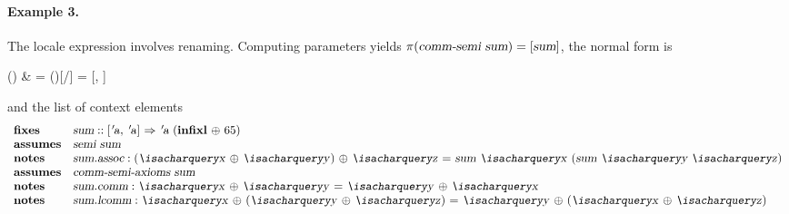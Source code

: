 \begin{isabellebody}
\begin{isamarkuptext}
\paragraph{Example 3.}
  The locale expression  involves
  renaming.  Computing parameters yields $\pi(\emph{\sl comm{\mbox{-}}semi\ sum})
  = [\emph{\sl sum}]$, the normal form is
\begin{align*%
}
  \N() & =
  \N()[/] =
  [, ]
\end{align*%
}
  and the list of context elements
\[
\begin{array}{ll}
  \textbf{fixes} & \isa{sum} :: \isa{{\isachardoublequote}{\isacharbrackleft}{\isacharprime}a{\isacharcomma}\ {\isacharprime}a{\isacharbrackright}\ {\isasymRightarrow}\ {\isacharprime}a{\isachardoublequote}}
    ~(\textbf{infixl}~\isa{{\isachardoublequote}{\isasymoplus}{\isachardoublequote}}~65) \\
  \textbf{assumes} & \isa{{\isachardoublequote}semi\ sum{\isachardoublequote}} \\
  \textbf{notes} & \isa{sum{\isachardot}assoc}: \isa{{\isachardoublequote}{\isacharparenleft}{\isacharquery}x\ {\isasymoplus}\ {\isacharquery}y{\isacharparenright}\ {\isasymoplus}\ {\isacharquery}z\ {\isacharequal}\ sum\ {\isacharquery}x\ {\isacharparenleft}sum\ {\isacharquery}y\ {\isacharquery}z{\isacharparenright}{\isachardoublequote}} \\
  \textbf{assumes} & \isa{{\isachardoublequote}comm{\isacharunderscore}semi{\isacharunderscore}axioms\ sum{\isachardoublequote}} \\
  \textbf{notes} & \isa{sum{\isachardot}comm}: \isa{{\isachardoublequote}{\isacharquery}x\ {\isasymoplus}\ {\isacharquery}y\ {\isacharequal}\ {\isacharquery}y\ {\isasymoplus}\ {\isacharquery}x{\isachardoublequote}} \\
  \textbf{notes} & \isa{sum{\isachardot}lcomm}: \isa{{\isachardoublequote}{\isacharquery}x\ {\isasymoplus}\ {\isacharparenleft}{\isacharquery}y\ {\isasymoplus}\ {\isacharquery}z{\isacharparenright}\ {\isacharequal}\ {\isacharquery}y\ {\isasymoplus}\ {\isacharparenleft}{\isacharquery}x\ {\isasymoplus}\ {\isacharquery}z{\isacharparenright}{\isachardoublequote}}
\end{array}
\]


\end{isamarkuptext}
\end{isabellebody}
